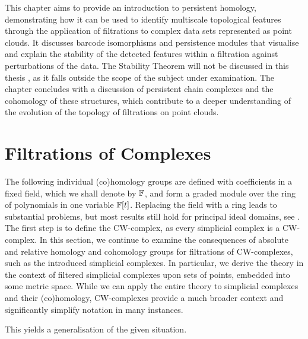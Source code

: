 \label{PersistentHomology}
This chapter aims to provide an introduction to persistent homology, demonstrating how it can be used to identify multiscale topological features through the application of filtrations to complex data sets represented as point clouds. It discusses barcode isomorphisms and persistence modules that visualise and explain the stability of the detected features within a filtration against perturbations of the data. 
The Stability Theorem will not be discussed in this thesis \cite[Theorem 4.20]{chazal2016structure}, as it falls outside the scope of the subject under examination. The chapter concludes with a discussion of persistent chain complexes and the cohomology of these structures, which contribute to a deeper understanding of the evolution of the topology of filtrations on point clouds.

\section{Filtrations of Complexes}
\label{FiltrationsofComplexes}
The following individual (co)homology groups are defined with coefficients in a fixed field, which we shall denote by ${\mathbb{F}}$, and form a graded module over the ring of polynomials in one variable ${\mathbb{F}}[t]$. Replacing the field with a ring leads to substantial problems, but most results still hold for principal ideal domains, see \cite[Theorem 2.1, \S 3.1]{zomorodian2004computing}. The first step is to define the CW-complex, as every simplicial complex is a CW-complex. In this section, we continue to examine the consequences of absolute and relative homology and cohomology groups for filtrations of CW-complexes, such as the introduced simplicial complexes. In particular, we derive the theory in the context of filtered simplicial complexes upon sets of points, embedded into some metric space. While we can apply the entire theory to simplicial complexes and their (co)homology, CW-complexes provide a much broader context and significantly simplify notation in many instances.

This yields a generalisation of the given situation.

